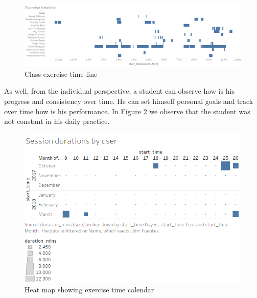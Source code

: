 \begin{figure}[!h]
	\centering
	\includegraphics[width=1\linewidth]{gfx/Exercise_timeline}
	\caption{Class exercise time line}
	\label{fig:Exercise_timeline}
\end{figure}

As well, from the individual perspective, a student can observe how is his progress and consistency over time. He can set himself personal goals and track over time how is his performance. In Figure \ref{fig:Session_durations_by_user} we observe that the student was not constant in his daily practice.

\begin{figure}[!h]
	\centering
	\includegraphics[width=1\linewidth]{gfx/Session_durations_by_user}
	\caption{Heat map showing exercise time calendar}
	\label{fig:Session_durations_by_user}
\end{figure}
